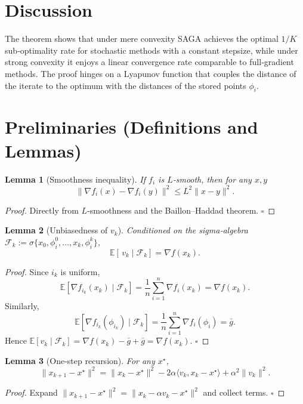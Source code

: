 \documentclass{article}
\newtheorem{lemma}{Lemma}
\newcommand{\E}{\mathbb{E}}
\begin{document}
\section*{Discussion}
The theorem shows that under mere convexity SAGA achieves the optimal $1/K$ sub‑optimality rate for stochastic methods with a constant stepsize, while under strong convexity it enjoys a linear convergence rate comparable to full‑gradient methods. The proof hinges on a Lyapunov function that couples the distance of the iterate to the optimum with the distances of the stored points $\phi_i$.

\section*{Preliminaries (Definitions and Lemmas)}
\begin{lemma}[Smoothness inequality]\label{lem:smooth}
If $f_i$ is $L$‑smooth, then for any $x,y$
\[
\|\nabla f_i(x)-\nabla f_i(y)\|^{2}\le L^{2}\|x-y\|^{2}.
\]
\end{lemma}
\begin{proof}
Directly from $L$‑smoothness and the Baillon–Haddad theorem. \hfill $\square$
\end{proof}

\begin{lemma}[Unbiasedness of $v_k$]\label{lem:unbiased}
Conditioned on the sigma‑algebra $\mathcal{F}_k:=\sigma\{x_0,\phi_i^0,\dots,x_k,\phi_i^k\}$,
\[
\E\!\left[\,v_k\mid\mathcal{F}_k\right]=\nabla f(x_k).
\]
\end{lemma}
\begin{proof}
Since $i_k$ is uniform,
\[
\E\!\left[\nabla f_{i_k}(x_k)\mid\mathcal{F}_k\right]=\frac1n\sum_{i=1}^{n}\nabla f_i(x_k)=\nabla f(x_k).
\]
Similarly,
\[
\E\!\left[\nabla f_{i_k}(\phi_{i_k})\mid\mathcal{F}_k\right]=\frac1n\sum_{i=1}^{n}\nabla f_i(\phi_i)=\bar g.
\]
Hence $\E[v_k\mid\mathcal{F}_k]=\nabla f(x_k)-\bar g+\bar g=\nabla f(x_k)$. \hfill $\square$
\end{proof}

\begin{lemma}[One‑step recursion]\label{lem:one-step}
For any $x^{\star}$,
\[
\|x_{k+1}-x^{\star}\|^{2}
= \|x_k-x^{\star}\|^{2}
-2\alpha\langle v_k,x_k-x^{\star}\rangle
+\alpha^{2}\|v_k\|^{2}.
\tag{4}
\]
\end{lemma}
\begin{proof}
Expand $\|x_{k+1}-x^{\star}\|^{2}
=\|x_k-\alpha v_k-x^{\star}\|^{2}$ and collect terms. \hfill $\square$
\end{proof}
\end{document}
